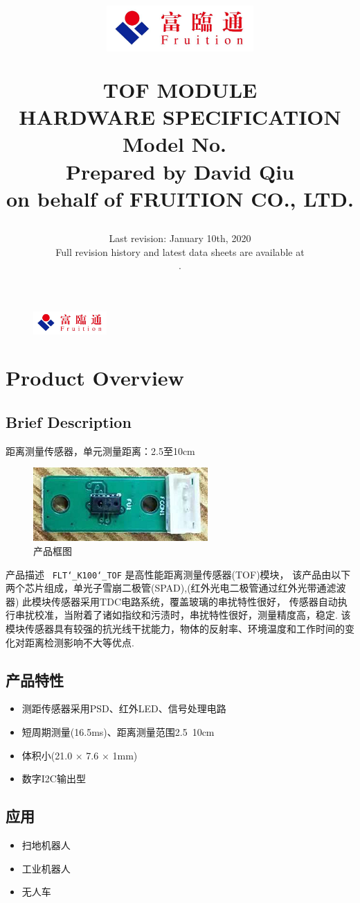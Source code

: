 \documentclass{scrreprt}
\title{
	\begin{figure}[H]
		\centering\includegraphics[width=0.5\textwidth]{logo.jpeg}
	\end{figure}
	\vspace{1cm}
	\flushright
	\Huge{TOF MODULE}\\
	\Huge{HARDWARE SPECIFICATION}\\
	\vspace{2cm}
	\huge{Model No.\ \modelno}\\
	\vspace{2cm}
	\LARGE{Prepared by David Qiu \\ on behalf of FRUITION CO., LTD.}
}
\date{
	Last revision: January 10th, 2020\\
	\vspace{0.5cm}
	Full revision history and latest data sheets are available at\\
	\vspace{0.25cm}
	\upstream.
}
\newcommand{\pchapter}[1]{
	\begingroup\let\clearpage\relax
	\newpage
	\begin{figure}[H]
		\includegraphics[width=0.25\textwidth]{logo.jpeg}
	\end{figure}
	\chapter{#1}
	\endgroup
}
\newcommand{\modelno}{
	\texttt{FLT\char`_K100\char`_TOF}
}
\newcommand{\x}{
	$\times$
}
\begin{document}
\begin{CJK*}{UTF8}{gbsn}
\maketitle
\tableofcontents

\pchapter{Product Overview}
\section{Brief Description}
距离测量传感器，单元测量距离：2.5至10cm

\begin{figure}[H]
\center\includegraphics{tof-picture.png}
\caption{产品框图}
\end{figure}

产品描述\ \modelno 是高性能距离测量传感器(TOF)模块，
该产品由以下两个芯片组成，单光子雪崩二极管(SPAD),(红外光电二极管通过红外光带通滤波器)
此模块传感器采用TDC电路系统，覆盖玻璃的串扰特性很好，
传感器自动执行串扰校准，当附着了诸如指纹和污渍时，串扰特性很好，测量精度高，稳定.
该模块传感器具有较强的抗光线干扰能力，物体的反射率、环境温度和工作时间的变化对距离检测影响不大等优点.

\section{产品特性}
\begin{itemize}
	\item 测距传感器采用PSD、红外LED、信号处理电路
	\item 短周期测量(16.5ms)、距离测量范围2.5~10cm
	\item 体积小(21.0\x7.6\x1mm)
	\item 数字I2C输出型
\end{itemize}

\section{应用}
\begin{itemize}
	\item 扫地机器人
	\item 工业机器人
	\item 无人车
\end{itemize}


\end{CJK*}
\end{document}
